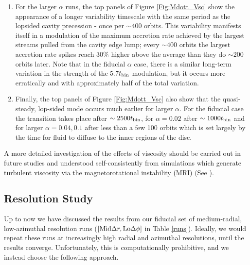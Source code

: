 \begin{enumerate}
	\item{For the larger $\alpha$ runs, the top panels of Figure \ref{Fig:Mdott_Vsc} show the appearance of a longer variability timescale with the same period as the lopsided cavity precession - once per $\sim400$ orbits. This variability manifests itself in a modulation of the maximum accretion rate achieved by the largest streams pulled from the cavity edge lump; every $\sim 400$ orbits the largest accretion rate spikes reach $30 \%$ higher above the average than they do $\sim 200$ orbits later. Note that in the fiducial $\alpha$ case, there is a similar long-term variation in the strength of the $5.7 t_{\rm bin}$ modulation, but it occurs more erratically and with approximately half of the total variation.}
	\label{vi}
	\item{Finally, the top panels of Figure \ref{Fig:Mdott_Vsc} also show that the quasi-steady, lop-sided mode occurs much earlier for larger $\alpha$. For the fiducial case the transition takes place after $\sim 2500  t_{\rm bin}$, for $\alpha=0.02$ after $	\sim 1000  t_{\rm bin}$ and for larger $\alpha=0.04, 0.1$ after less than a few 100 orbits which is set largely by the time for fluid to diffuse to the inner regions of the disc.}
\end{enumerate}
A more detailed investigation of the effects of viscosity should be carried out in future studies and understood self-consistently from simulations which generate turbulent viscosity via the magnetorotational instability (MRI) (See \citealt{ShiKrolik:2012,Noble+2012}). 



\subsection{Resolution Study}
\label{Resolution Study}
Up to now we have discussed the results from our fiducial set of
medium-radial, low-azimuthal resolution runs ($\left[ \hbox{Mid}
  \Delta r, \hbox{Lo}\Delta \phi\right]$ in Table \ref{runs}).
Ideally, we would repeat these runs at increasingly high radial and
azimuthal resolutions, until the results converge.  Unfortunately,
this is computationally prohibitive, and we instead choose the
following approach.

